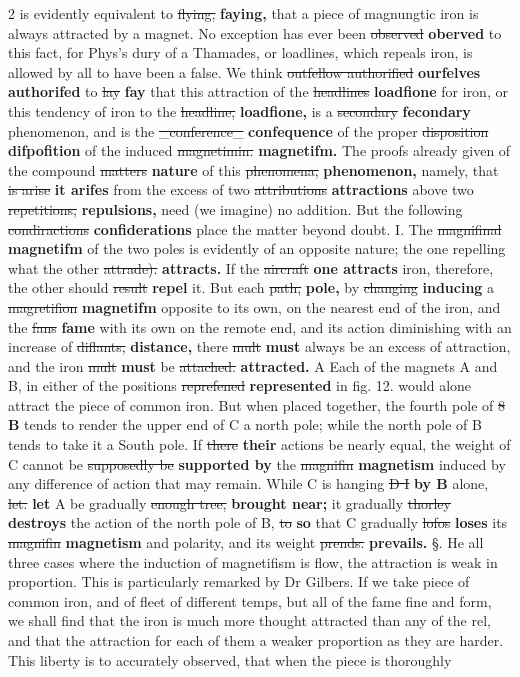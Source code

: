 \documentclass[10pt]{article}
\begin{document}
\begin{multicols}{2}
is evidently equivalent to \sout{flying,} \textbf{faying,} that a piece of magnungtic iron is always attracted by a magnet. No exception has ever been \sout{observed} \textbf{oberved} to this fact, for Phys's dury of a Thamades, or loadlines, which repeals iron, is allowed by all to have been a false. We think \sout{outfellow authorified} \textbf{ourfelves authorifed} to \sout{lay} \textbf{fay} that this attraction of the \sout{headlines} \textbf{loadfione} for iron, or this tendency of iron to the \sout{headline,} \textbf{loadfione,} is a \sout{secondary} \textbf{fecondary} phenomenon, and is the \sout{\_conference\_} \textbf{confequence} of the proper \sout{disposition} \textbf{difpofition} of the induced \sout{magnetimin.} \textbf{magnetifm.} The proofs already given of the compound \sout{matters} \textbf{nature} of this \sout{phenomena,} \textbf{phenomenon,} namely, that \sout{is arise} \textbf{it arifes} from the excess of two \sout{attributions} \textbf{attractions} above two \sout{repetitions,} \textbf{repulsions,} need (we imagine) no addition. But the following \sout{condiractions} \textbf{confiderations} place the matter beyond doubt. I. The \sout{magnifinal} \textbf{magnetifm} of the two poles is evidently of an opposite nature; the one repelling what the other \sout{attrade).} \textbf{attracts.} If the \sout{aircraft} \textbf{one attracts} iron, therefore, the other should \sout{result} \textbf{repel} it. But each \sout{path,} \textbf{pole,} by \sout{changing} \textbf{inducing} a \sout{magretifion} \textbf{magnetifm} opposite to its own, on the nearest end of the iron, and the \sout{fans} \textbf{fame} with its own on the remote end, and its action diminishing with an increase of \sout{diflants,} \textbf{distance,} there \sout{mult} \textbf{must} always be an excess of attraction, and the iron \sout{mult} \textbf{must} be \sout{attached.} \textbf{attracted.} A Each of the magnets A and B, in either of the positions \sout{reprefened} \textbf{represented} in fig. 12. would alone attract the piece of common iron. But when placed together, the fourth pole of \sout{8} \textbf{B} tends to render the upper end of C a north pole; while the north pole of B tends to take it a South pole. If \sout{there} \textbf{their} actions be nearly equal, the weight of C cannot be \sout{supposedly be} \textbf{supported by} the \sout{magnifin} \textbf{magnetism} induced by any difference of action that may remain. While C is hanging \sout{D I} \textbf{by B} alone, \sout{let.} \textbf{let} A be gradually \sout{enough tree,} \textbf{brought near;} it gradually \sout{thorley} \textbf{destroys} the action of the north pole of B, \sout{to} \textbf{so} that C gradually \sout{lofos} \textbf{loses} its \sout{magnifin} \textbf{magnetism} and polarity, and its weight \sout{prends.} \textbf{prevails.} §. He all three cases where the induction of magnetifism is flow, the attraction is weak in proportion. This is particularly remarked by Dr Gilbers. If we take piece of common iron, and of fleet of different temps, but all of the fame fine and form, we shall find that the iron is much more thought attracted than any of the rel, and that the attraction for each of them a weaker proportion as they are harder. This liberty is to accurately observed, that when the piece is thoroughly


\end{multicols}
\end{document}
